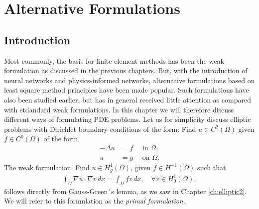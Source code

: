 \chapter{Alternative Formulations}


\section{Introduction}

Most commonly, the basis for finite element methods has been the weak formulation as discussed in 
the previous chapters. But, with the introduction of neural networks and physics-informed networks, 
alternative formulations based on least square method principles have been made popular. Such formulations
have also been studied earlier, but has in general received little attention as compared with stdandard weak formulations.   
In this chapter we will therefore discuss different ways of formulating PDE problems. 
Let us for simplicity discuss elliptic problems with Dirichlet boundary conditions of the 
form: Find $u \in C^2(\Omega)$ given $f \in C^0(\Omega)$ of the form
\begin{align}
-\Delta u &= f \quad \mbox{ in } \Omega, \\ 
 u &= g \quad \mbox{ on } \Omega .  
\end{align}
The weak formulation: Find $u \in H^1_g(\Omega)$, given  $f \in H^{-1}(\Omega)$ such 
that 
\begin{align}
\label{weak:primal}
\int_\Omega \nabla u \cdot \nabla v \, dx = \int_\Omega f v \, dx, \quad \forall v\in H^1_0(\Omega),       
\end{align}
follows directly from Gauss-Green´s lemma, as we saw in Chapter \ref{ch:elliptic2}. 
We will refer to this formulation as the \emph{primal formulation}. 

